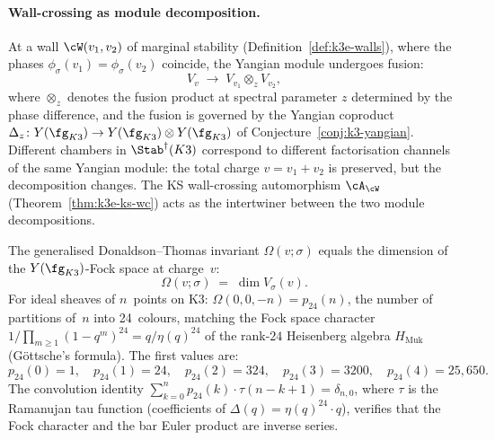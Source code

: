 \paragraph{Wall-crossing as module decomposition.}
At a wall $\cW(v_1, v_2)$ of marginal stability (Definition~\ref{def:k3e-walls}), where the phases $\phi_\sigma(v_1) = \phi_\sigma(v_2)$ coincide, the Yangian module undergoes fusion:
\begin{equation}\label{eq:yangian-wall-crossing-fusion}
  V_v \;\longrightarrow\; V_{v_1} \otimes_z V_{v_2},
\end{equation}
where $\otimes_z$ denotes the fusion product at spectral parameter $z$ determined by the phase difference, and the fusion is governed by the Yangian coproduct $\Delta_z \colon Y(\fg_{K3}) \to Y(\fg_{K3}) \otimes Y(\fg_{K3})$ of Conjecture~\ref{conj:k3-yangian}.  Different chambers in $\Stab^\dagger(K3)$ correspond to different factorisation channels of the same Yangian module: the total charge $v = v_1 + v_2$ is preserved, but the decomposition changes.  The KS wall-crossing automorphism $\cA_{\cW}$ (Theorem~\ref{thm:k3e-ks-wc}) acts as the intertwiner between the two module decompositions.

\begin{conjecture}
\label{conj:dt-fock-dimension}
\ClaimStatusConjectured
The generalised Donaldson--Thomas invariant $\Omega(v; \sigma)$ equals the dimension of the $Y(\fg_{K3})$-Fock space at charge~$v$:
\[
  \Omega(v; \sigma) \;=\; \dim V_\sigma(v).
\]
For ideal sheaves of $n$~points on K3: $\Omega(0, 0, -n) = p_{24}(n)$, the number of partitions of~$n$ into 24~colours, matching the Fock space character $1/\prod_{m \geq 1}(1-q^m)^{24} = q/\eta(q)^{24}$ of the rank-$24$ Heisenberg algebra $H_{\mathrm{Muk}}$ (G\"ottsche's formula).  The first values are:
\[
  p_{24}(0) = 1, \quad p_{24}(1) = 24, \quad p_{24}(2) = 324, \quad p_{24}(3) = 3200, \quad p_{24}(4) = 25{,}650.
\]
The convolution identity $\sum_{k=0}^{n} p_{24}(k) \cdot \tau(n-k+1) = \delta_{n,0}$, where $\tau$ is the Ramanujan tau function (coefficients of $\Delta(q) = \eta(q)^{24} \cdot q$), verifies that the Fock character and the bar Euler product are inverse series.
\end{conjecture}


